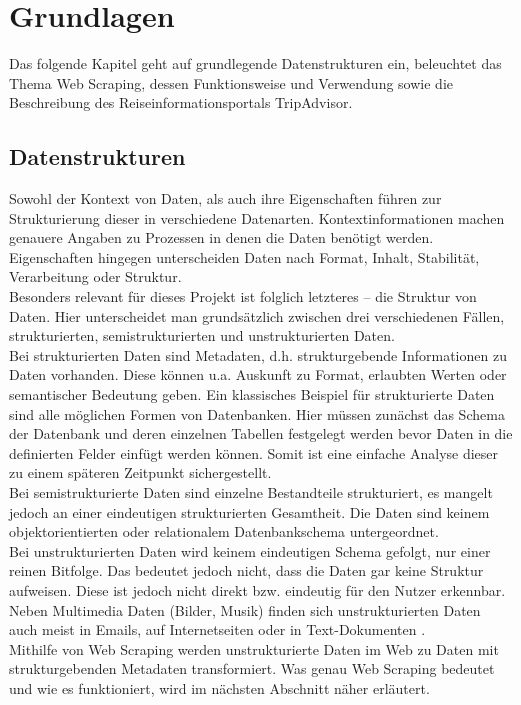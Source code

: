 \documentclass[a4paper,oneside,12pt]{report}
\begin{document}
		

	\chapter{Grundlagen}\label{grlagen}
	
		Das folgende Kapitel geht auf grundlegende Datenstrukturen ein, beleuchtet das Thema Web Scraping, dessen Funktionsweise und Verwendung sowie die Beschreibung des Reiseinformationsportals TripAdvisor. 
	
		\section[Datenstrukturen - Anja Wolf]{Datenstrukturen}
			
			Sowohl der Kontext von Daten, als auch ihre Eigenschaften führen zur Strukturierung dieser in verschiedene Datenarten. Kontextinformationen machen genauere Angaben zu Prozessen in denen die Daten benötigt werden. Eigenschaften hingegen unterscheiden Daten nach Format, Inhalt, Stabilität, Verarbeitung oder Struktur.
			\\
			Besonders relevant für dieses Projekt ist folglich letzteres – die Struktur von Daten. Hier unterscheidet man grundsätzlich zwischen drei verschiedenen Fällen, strukturierten, semistrukturierten und unstrukturierten Daten.
			\\
			Bei strukturierten Daten sind Metadaten, d.h. strukturgebende Informationen zu Daten vorhanden. Diese können u.a. Auskunft zu Format, erlaubten Werten oder semantischer Bedeutung geben. Ein klassisches Beispiel für strukturierte Daten sind alle möglichen Formen von Datenbanken. Hier müssen zunächst das Schema der Datenbank und deren einzelnen Tabellen festgelegt werden bevor Daten in die definierten Felder einfügt werden können. Somit ist eine einfache Analyse dieser zu einem späteren Zeitpunkt sichergestellt.
			\\
			Bei semistrukturierte Daten sind einzelne Bestandteile strukturiert, es mangelt jedoch an einer eindeutigen strukturierten Gesamtheit. Die Daten sind keinem objektorientierten oder relationalem Datenbankschema untergeordnet.
			\\
			Bei unstrukturierten Daten wird keinem eindeutigen Schema gefolgt, nur einer reinen Bitfolge. Das bedeutet jedoch nicht, dass die Daten gar keine Struktur aufweisen. Diese ist jedoch nicht direkt bzw. eindeutig für den Nutzer erkennbar. Neben Multimedia Daten (Bilder, Musik) finden sich unstrukturierten Daten auch meist in Emails, auf Internetseiten oder in Text-Dokumenten \cite{bib-daten}.
			\\
			Mithilfe von Web Scraping werden unstrukturierte Daten im Web zu Daten mit strukturgebenden Metadaten transformiert. Was genau Web Scraping bedeutet und wie es funktioniert, wird im nächsten Abschnitt näher erläutert.
			
\end{document}
